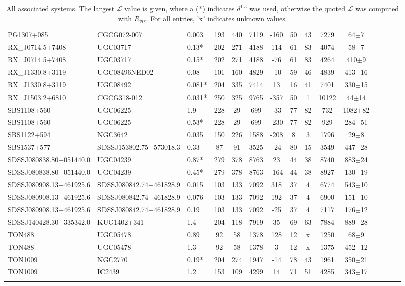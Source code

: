 \documentclass[iop]{emulateapj-rtx4}
\begin{document}
\begin{table}[ht]
\begin{center}
\begin{tabular}{l l l c c c c c c c c c c c c}
PG1307+085 & CGCG072-007 & 0.003 & 193 & 440 & 7119 & -160 & 50 & 43 & 7279 & 64$\pm$7\\
RX\_J0714.5+7408 & UGC03717 & 0.13* & 202 & 271 & 4188 & 114 & 61 & 83 & 4074 & 58$\pm$7\\
RX\_J0714.5+7408 & UGC03717 & 0.15* & 202 & 271 & 4188 & -76 & 61 & 83 & 4264 & 410$\pm$9\\
RX\_J1330.8+3119 & UGC08496NED02 & 0.08 & 101 & 160 & 4829 & -10 & 59 & 46 & 4839 & 413$\pm$16\\
RX\_J1330.8+3119 & UGC08492 & 0.081* & 204 & 335 & 7414 & 13 & 16 & 41 & 7401 & 330$\pm$15\\
RX\_J1503.2+6810 & CGCG318-012 & 0.031* & 250 & 325 & 9765 & -357 & 50 & 1 & 10122 & 44$\pm$14\\
SBS1108+560 & UGC06225 & 1.9 & 228 & 29 & 699 & -33 & 77 & 82 & 732 & 1082$\pm$82\\
SBS1108+560 & UGC06225 & 0.53* & 228 & 29 & 699 & -230 & 77 & 82 & 929 & 284$\pm$51\\
SBS1122+594 & NGC3642 & 0.035 & 150 & 226 & 1588 & -208 & 8 & 3 & 1796 & 29$\pm$8\\
SBS1537+577 & SDSSJ153802.75+573018.3 & 0.33 & 87 & 91 & 3525 & -24 & 80 & 15 & 3549 & 447$\pm$28\\
SDSSJ080838.80+051440.0 & UGC04239 & 0.87* & 279 & 378 & 8763 & 23 & 44 & 38 & 8740 & 883$\pm$24\\
SDSSJ080838.80+051440.0 & UGC04239 & 0.45* & 279 & 378 & 8763 & -164 & 44 & 38 & 8927 & 130$\pm$19\\
SDSSJ080908.13+461925.6 & SDSSJ080842.74+461828.9 & 0.015 & 103 & 133 & 7092 & 318 & 37 & 4 & 6774 & 543$\pm$10\\
SDSSJ080908.13+461925.6 & SDSSJ080842.74+461828.9 & 0.076 & 103 & 133 & 7092 & 192 & 37 & 4 & 6900 & 151$\pm$10\\
SDSSJ080908.13+461925.6 & SDSSJ080842.74+461828.9 & 0.19 & 103 & 133 & 7092 & -25 & 37 & 4 & 7117 & 176$\pm$12\\
SDSSJ140428.30+335342.0 & KUG1402+341 & 1.4 & 204 & 118 & 7919 & 35 & 69 & 63 & 7884 & 889$\pm$28\\
TON488 & UGC05478 & 0.89 & 92 & 58 & 1378 & 128 & 12 & x & 1250 & 68$\pm$9\\
TON488 & UGC05478 & 1.3 & 92 & 58 & 1378 & 3 & 12 & x & 1375 & 452$\pm$12\\
TON1009 & NGC2770 & 0.19* & 204 & 274 & 1947 & -14 & 78 & 43 & 1961 & 350$\pm$21\\
TON1009 & IC2439 & 1.2 & 153 & 109 & 4299 & 14 & 71 & 51 & 4285 & 343$\pm$17\\
 \\
\hline
\end{tabular}
\end{center}
  \caption{\small{All associated systems. The largest $\mathcal{L}$ value is given, where a (\**) indicates $d^{1.5}$ was used, otherwise the quoted $\mathcal{L}$ was computed with $R_{vir}$. For all entries, 'x' indicates unknown values.}}
  \label{target_table}
\end{table}
\end{document}
